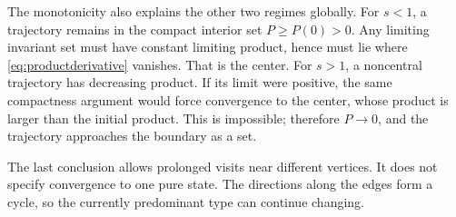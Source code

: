 \documentclass[11pt,oneside,openany]{book}
\theoremstyle{definition}
\theoremstyle{remark}
\numberwithin{equation}{chapter}
\begin{document}
The monotonicity also explains the other two regimes globally. For $s<1$, a trajectory remains in the compact interior set $P\geq P(0)>0$. Any limiting invariant set must have constant limiting product, hence must lie where \eqref{eq:productderivative} vanishes. That is the center. For $s>1$, a noncentral trajectory has decreasing product. If its limit were positive, the same compactness argument would force convergence to the center, whose product is larger than the initial product. This is impossible; therefore $P\to0$, and the trajectory approaches the boundary as a set.

The last conclusion allows prolonged visits near different vertices. It does not specify convergence to one pure state. The directions along the edges form a cycle, so the currently predominant type can continue changing.
\end{document}
